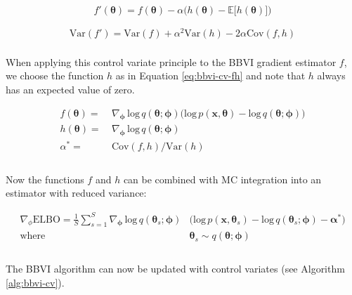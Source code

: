 \begin{equation}
    \label{eq:bbvi-cv}
    f'(\bm \theta) = f(\bm \theta) - \alpha \big( h(\bm \theta) - \mathbb{E} \big[ h(\bm \theta) \big] \big)
\end{equation}

\begin{equation}
    \label{eq:bbvi-cv-variance}
    \begin{split}
        \mathrm{Var}(f') = \mathrm{Var}(f) + \alpha^2\mathrm{Var}(h) - 2\alpha\mathrm{Cov}(f, h)
    \end{split}
\end{equation}
\\
When applying this control variate principle to the BBVI gradient estimator $f$, we choose the function $h$ as in Equation \ref{eq:bbvi-cv-fh} and note that $h$ always has an expected value of zero.

\begin{equation}
    \label{eq:bbvi-cv-fh}
    \begin{split}
        f(\bm\theta) = & \: \nabla_{\bm\phi} \, \mathrm{log} \, q(\bm\theta; \bm\phi) \big(\mathrm{log} \, p(\bm x, \bm\theta) - \mathrm{log} \, q(\bm\theta; \bm\phi) \big) \\
        h(\bm\theta) = & \: \nabla_{\bm\phi} \, \mathrm{log} \, q(\bm\theta; \bm\phi) \\
        \alpha^* = & \: \mathrm{Cov}(f, h) / \mathrm{Var}(h) \\
    \end{split}
\end{equation}
\\
Now the functions $f$ and $h$ can be combined with MC integration into an estimator with reduced variance:

\begin{equation}
    \label{eq:bbvo-cv-total}
    \begin{split}
        \nabla_{\phi} \mathrm{ELBO} = \frac{1}{S} \sum^S_{s=1} \nabla_{\bm\phi} \, \mathrm{log} \, q(\bm\theta_s; \bm\phi) & \big( \mathrm{log} \, p(\bm x, \bm\theta_s) - \mathrm{log} \, q(\bm\theta_s; \bm\phi) - \bm\alpha^* \big) \\
        \mathrm{where} \; & \bm\theta_s \sim q(\bm\theta; \bm\phi) \\
    \end{split}
\end{equation}
\\
The BBVI algorithm can now be updated with control variates (see Algorithm \ref{alg:bbvi-cv}).

